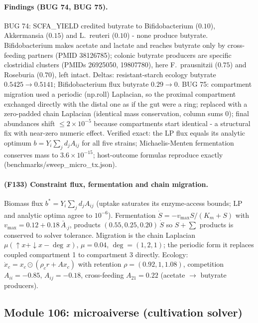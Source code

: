 \paragraph{Findings (BUG 74, BUG 75).} BUG 74: SCFA\_YIELD credited butyrate to Bifidobacterium ($0.10$), Akkermansia ($0.15$) and L.\ reuteri ($0.10$) - none produce butyrate. Bifidobacterium makes acetate and lactate and reaches butyrate only by cross-feeding partners (PMID 38126785); colonic butyrate producers are specific clostridial clusters (PMIDs 26925050, 19807780), here F.\ prausnitzii ($0.75$) and Roseburia ($0.70$), left intact. Deltas: resistant-starch ecology butyrate $0.5425\to0.5141$; Bifidobacterium flux butyrate $0.29\to0$. BUG 75: compartment migration used a periodic (np.roll) Laplacian, so the proximal compartment exchanged directly with the distal one as if the gut were a ring; replaced with a zero-padded chain Laplacian (identical mass conservation, column sums $0$); final abundances shift $\le2\times10^{-5}$ because compartments start identical - a structural fix with near-zero numeric effect. Verified exact: the LP flux equals its analytic optimum $b=Y_i\sum_j d_j A_{ij}$ for all five strains; Michaelis-Menten fermentation conserves mass to $3.6\times10^{-15}$; host-outcome formulas reproduce exactly (benchmarks/sweep\_micro\_tx.json).
\paragraph{(F133) Constraint flux, fermentation and chain migration.} Biomass flux $b^\ast=Y_i\sum_j d_j A_{ij}$ (uptake saturates its enzyme-access bounds; LP and analytic optima agree to $10^{-6}$). Fermentation $\dot S=-v_{\max}S/(K_m+S)$ with $v_{\max}=0.12+0.18\,\bar A_{\cdot j}$, products $(0.55,0.25,0.20)\,\dot S$ so $S+\sum$ products is conserved to solver tolerance. Migration is the chain Laplacian $\mu(\uparrow x+\downarrow x-\deg\,x)$, $\mu=0.04$, $\deg=(1,2,1)$; the periodic form it replaces coupled compartment 1 to compartment 3 directly. Ecology: $\dot x_c=x_c\odot(\rho_c r+A x_c)$ with retention $\rho=(0.92,1,1.08)$, competition $A_{ii}=-0.85$, $A_{ij}=-0.18$, cross-feeding $A_{21}=0.22$ (acetate $\to$ butyrate producers).
\subsection{Module 106: microaiverse (cultivation solver)}
